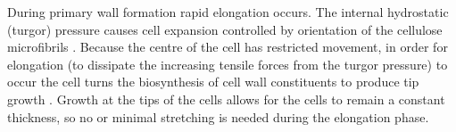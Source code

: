 During primary wall formation rapid elongation occurs. The internal hydrostatic (turgor) pressure causes cell expansion controlled by orientation of the cellulose microfibrils \cite{Tyerman_2002} \cite{16261190}.
Because the centre of the cell has restricted movement, in order for elongation
(to dissipate the increasing tensile forces from the turgor pressure)
to occur the cell turns the biosynthesis of cell wall constituents to produce
tip growth \cite{taiz2006plant}. Growth at the tips of the cells allows for the cells to
remain a constant thickness, so no or minimal stretching is needed during the elongation
phase.